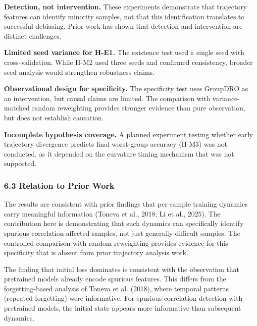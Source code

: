 \textbf{Detection, not intervention.} These experiments demonstrate that trajectory features can identify minority samples, not that this identification translates to successful debiasing. Prior work has shown that detection and intervention are distinct challenges.

\textbf{Limited seed variance for H-E1.} The existence test used a single seed with cross-validation. While H-M2 used three seeds and confirmed consistency, broader seed analysis would strengthen robustness claims.

\textbf{Observational design for specificity.} The specificity test uses GroupDRO as an intervention, but causal claims are limited. The comparison with variance-matched random reweighting provides stronger evidence than pure observation, but does not establish causation.

\textbf{Incomplete hypothesis coverage.} A planned experiment testing whether early trajectory divergence predicts final worst-group accuracy (H-M3) was not conducted, as it depended on the curvature timing mechanism that was not supported.

\subsubsection{6.3 Relation to Prior Work}

The results are consistent with prior findings that per-sample training dynamics carry meaningful information (Toneva et al., 2018; Li et al., 2025). The contribution here is demonstrating that such dynamics can specifically identify spurious correlation-affected samples, not just generally difficult samples. The controlled comparison with random reweighting provides evidence for this specificity that is absent from prior trajectory analysis work.

The finding that initial loss dominates is consistent with the observation that pretrained models already encode spurious features. This differs from the forgetting-based analysis of Toneva et al. (2018), where temporal patterns (repeated forgetting) were informative. For spurious correlation detection with pretrained models, the initial state appears more informative than subsequent dynamics.
